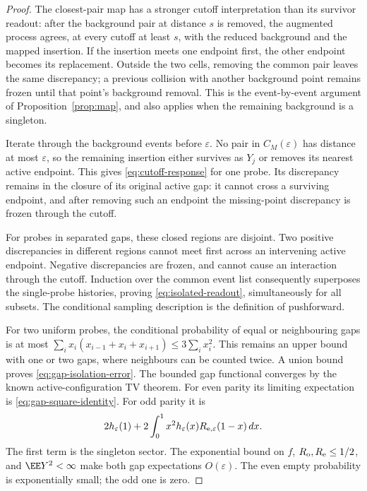 \documentclass[11pt,letterpaper]{article}
\begin{document}
\begin{proof}
The closest-pair map has a stronger cutoff interpretation than its
survivor readout: after the background pair at distance $s$ is removed,
the augmented process agrees, at every cutoff at least $s$, with the
reduced background and the mapped insertion. If the insertion meets
one endpoint first, the other endpoint becomes its replacement.
Outside the two cells, removing the common pair leaves the same
discrepancy; a previous collision with another background point
remains frozen until that point's background removal. This is the
event-by-event argument of Proposition~\ref{prop:map}, and also applies
when the remaining background is a singleton.

Iterate through the background events before $\varepsilon$. No pair
in $C_M(\varepsilon)$ has distance at most $\varepsilon$, so the
remaining insertion either survives as $Y_j$ or removes its nearest
active endpoint. This gives \eqref{eq:cutoff-response} for one probe.
Its discrepancy remains in the closure of its original active gap:
it cannot cross a surviving endpoint, and after removing such an
endpoint the missing-point discrepancy is frozen through the cutoff.

For probes in separated gaps, these closed regions are disjoint.
Two positive discrepancies in different regions cannot meet first
across an intervening active endpoint. Negative discrepancies are
frozen, and cannot cause an interaction through the cutoff. Induction
over the common event list consequently superposes the single-probe
histories, proving \eqref{eq:isolated-readout}, simultaneously for all
subsets. The conditional sampling description is the definition of
pushforward.

For two uniform probes, the conditional probability of equal or
neighbouring gaps is at most
$\sum_i x_i(x_{i-1}+x_i+x_{i+1})\le3\sum_i x_i^2$.
This remains an upper bound with one or two gaps, where neighbours
can be counted twice. A union bound proves
\eqref{eq:gap-isolation-error}. The bounded gap functional converges
by the known active-configuration TV theorem. For even parity its
limiting expectation is \eqref{eq:gap-square-identity}. For odd parity it is
\[
 2h_\varepsilon(1)+2\int_0^1x^2h_\varepsilon(x)
                   R_{{\rm e},\varepsilon}(1-x)\,dx.
\]
The first term is the singleton sector. The exponential bound on $f$,
$R_{\rm o},R_{\rm e}\le1/2$, and $\EE Y^2<\infty$ make both gap
expectations $O(\varepsilon)$. The even empty probability is
exponentially small; the odd one is zero.
\end{proof}
\end{document}
